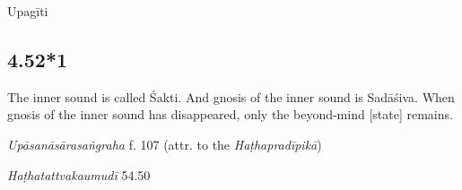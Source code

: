 \begin{ekdosis}
\begin{philcomm}[hp04_052]
\end{philcomm}

\begin{metre}[hp04_052]
Upagīti 
\end{metre}

\subsection*{4.52*1}
\begin{translation}[hp04_052_1]
The inner sound is called Śakti. And gnosis of the inner sound is Sadāśiva. When gnosis of the inner sound has disappeared, only the beyond-mind [state] remains.
\end{translation}
%


\begin{testimonia}[hp04_052_1]
\emph{Upāsanāsārasaṅgraha} f. 107 (attr. to the \emph{Haṭhapradīpikā})
\begin{versinnote}
\end{versinnote}

\emph{Haṭhatattvakaumudī} 54.50
\begin{versinnote}
\end{versinnote}
\end{testimonia}



\end{ekdosis}
